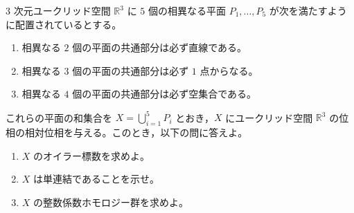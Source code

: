 \documentclass[12pt]{jlreq}
\begin{document}
$3$ 次元ユークリッド空間 $\mathbb{R}^3$ に $5$ 個の相異なる平面 $P_1, \ldots, P_5$ が次を満たすように配置されているとする。
\begin{enumerate}
  \item[(i)] 相異なる $2$ 個の平面の共通部分は必ず直線である。
  \item[(ii)] 相異なる $3$ 個の平面の共通部分は必ず $1$ 点からなる。
  \item[(iii)] 相異なる $4$ 個の平面の共通部分は必ず空集合である。
\end{enumerate}
これらの平面の和集合を $X = \bigcup_{i=1}^5 P_i$ とおき，$X$ にユークリッド空間 $\mathbb{R}^3$ の位相の相対位相を与える。このとき，以下の問に答えよ。

\begin{enumerate}
  \item $X$ のオイラー標数を求めよ。
  \item $X$ は単連結であることを示せ。
  \item $X$ の整数係数ホモロジー群を求めよ。
\end{enumerate}
\end{document}
